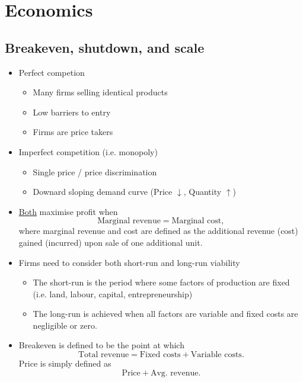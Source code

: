 \documentclass[../notes_compiled.tex]{subfiles}
\begin{document}
\section{Economics}

\subsection{Breakeven, shutdown, and scale}
\begin{itemize}
\item Perfect competion
\begin{itemize}
\item Many firms selling identical products
\item Low barriers to entry
\item Firms are price takers
\end{itemize}
\item Imperfect competition (i.e. monopoly)
\begin{itemize}
\item Single price / price discrimination
\item Downard sloping demand curve (Price $\downarrow$, Quantity $\uparrow$)
\end{itemize}
\item \underline{Both} maximise profit when
\begin{equation}
\text{Marginal revenue} = \text{Marginal cost},
\end{equation}
where marginal revenue and cost are defined as the additional revenue (cost) gained (incurred) upon sale of one additional unit.

\item Firms need to consider both short-run and long-run viability
\begin{itemize}
\item The short-run is the period where some factors of production are fixed (i.e. land, labour, capital, entrepreneurship)
\item The long-run is achieved when all factors are variable and fixed costs are negligible or zero.
\end{itemize}

\item Breakeven is defined to be the point at which
\begin{equation}
\text{Total revenue} = \text{Fixed costs} + \text{Variable costs}.
\end{equation}
Price is simply defined as
\begin{equation}
\text{Price} + \text{Avg. revenue}.
\end{equation}


\end{itemize}
\end{document}
